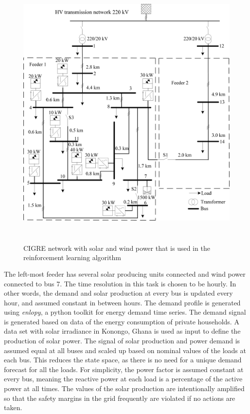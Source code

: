 \documentclass[class=book, crop=false]{standalone}
\begin{document}
\begin{figure}[H]
    \includegraphics[height=14cm, width=13.5cm]{figures/cigre_network_mv_der.png}
    \caption[size = 9]{CIGRE network with solar and wind power that is used in the reinforcement learning algorithm}
    \label{fig:problem:cigre_network}
\end{figure}
The left-most feeder has several solar producing units connected and wind power connected to bus 7. The time resolution in this task is chosen to be hourly. In other words, the demand and solar production at every bus is updated every hour, and assumed constant in between hours. The demand profile is generated using \textit{enlopy}, a python toolkit for energy demand time series\cite{enlopy}. The demand signal is generated based on data of the energy consumption of private households. A data set with solar irradiance in Konongo, Ghana is used as input to define the production of solar power. The signal of solar production and power demand is assumed equal at all buses and scaled up based on nominal values of the loads at each bus. This reduces the state space, as there is no need for a unique demand forecast for all the loads.  For simplicity, the power factor is assumed constant at every bus, meaning the reactive power at each load is a percentage of the active power at all times. The values of the solar production are intentionally amplified so that the safety margins in the grid frequently are violated if no actions are taken.   
\end{document}
